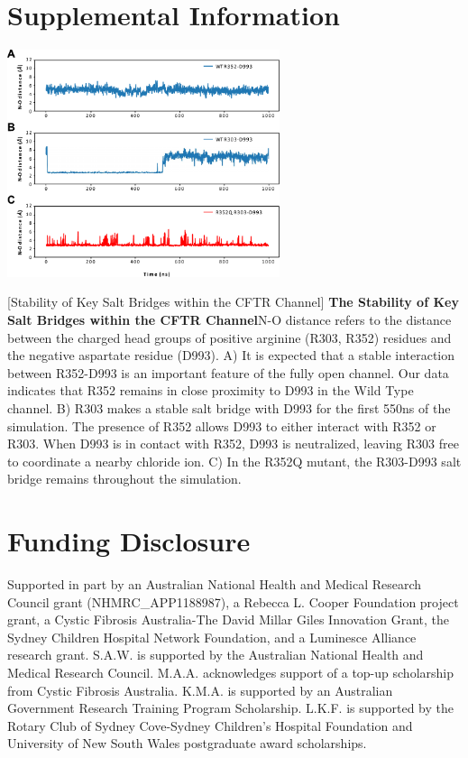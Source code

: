 \section{Supplemental Information}
\renewcommand{\thefigure}{\arabic{chapter}.E\arabic{figure}}

\setcounter{figure}{3}

\begin{center}
	\includegraphics[width=0.6\textwidth]{figures/R352Q/R352Q_E4.pdf}
\end{center}
\captionsetup{singlelinecheck = false, justification=raggedright}
\begingroup
{}[Stability of Key Salt Bridges within the CFTR Channel] {\textbf{The Stability of Key Salt Bridges within the CFTR Channel}}{N-O distance refers to the distance between the charged head groups of positive arginine (R303, R352) residues and the negative aspartate residue (D993). A) It is expected that a stable interaction between R352-D993 is an important feature of the fully open channel. Our data indicates that R352 remains in close proximity to D993 in the Wild Type channel. B) R303 makes a stable salt bridge with D993 for the first 550ns of the simulation. The presence of R352 allows D993 to either interact with R352 or R303. When D993 is in contact with R352, D993 is neutralized, leaving R303 free to coordinate a nearby chloride ion. C) In the R352Q mutant, the R303-D993 salt bridge remains throughout the simulation.}
\label{R352Q_E4}
\endgroup
\section{Funding Disclosure}
Supported in part by an Australian National Health and Medical Research Council grant (NHMRC\_APP1188987), a Rebecca L. Cooper Foundation project grant, a Cystic Fibrosis Australia-The David Millar Giles Innovation Grant, the Sydney Children Hospital Network Foundation, and a Luminesce Alliance research grant. S.A.W. is supported by the Australian National Health and Medical Research Council. M.A.A. acknowledges support of a top-up scholarship from Cystic Fibrosis Australia. K.M.A. is supported by an Australian Government Research Training Program Scholarship. L.K.F. is supported by the Rotary Club of Sydney Cove-Sydney Children’s Hospital Foundation and University of New South Wales postgraduate award scholarships.

